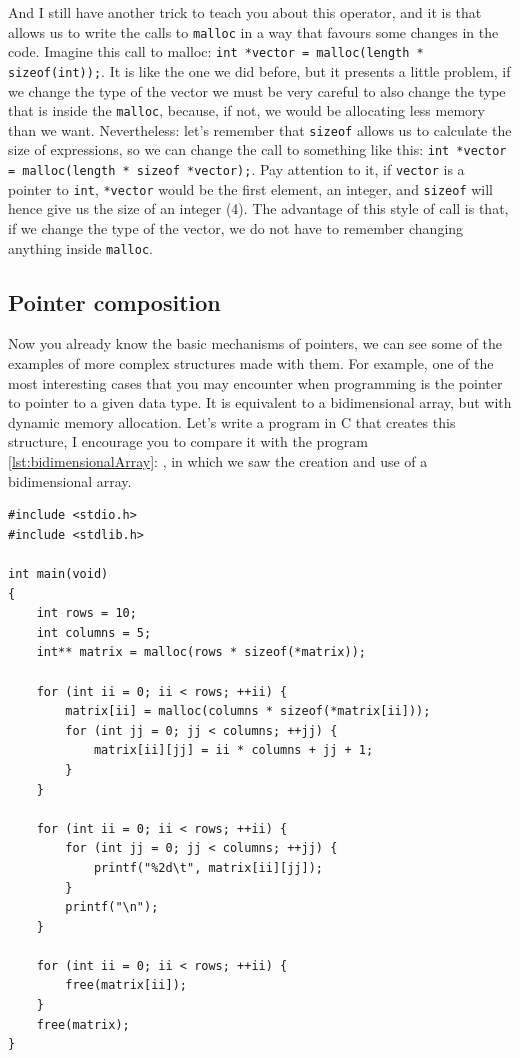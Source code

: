 \documentclass[a4paper]{article}
\begin{document}
And I still have another trick to teach you about this operator, and it is
that allows us to write the calls to \texttt{malloc} in a way that favours some
changes in the code. Imagine this call to malloc:
\lstinline[style=C]{int *vector = malloc(length * sizeof(int));}.
It is like the one we did before, but it presents a little problem, if we change
the type of the vector we must be very careful to also change the type that
is inside the \texttt{malloc}, because, if not, we would be allocating less
memory than we want. Nevertheless: let's remember that \verb!sizeof! allows us
to calculate the size of expressions, so we can change the call to something
like this: \lstinline[style=C]{int *vector = malloc(length * sizeof *vector);}.
Pay attention to it, if \verb!vector! is a pointer to \verb!int!, \verb!*vector!
would be the first element, an integer, and \verb!sizeof! will hence give us
the size of an integer (4). The advantage of this style of call is that, if we
change the type of the vector, we do not have to remember changing anything
inside \verb!malloc!.

\subsection{Pointer composition}
Now you already know the basic mechanisms of pointers, we can see some of the
examples of more complex structures made with them. For example, one of the most
interesting cases that you may encounter when programming is the pointer to
pointer to a given data type. It is equivalent to a bidimensional array, but
with dynamic memory allocation. Let's write a program in C that creates this
structure, I encourage you to compare it with the program
\ref{lst:bidimensionalArray}: , in which we
saw the creation and use of a bidimensional array.

\noindent
\begin{minipage}[H]{\linewidth}
\mbox{}
\begin{lstlisting}[style=C,
caption={Reserva, uso y liberación de un vector de vectores},
label={lst:bidimensionalVector}]
#include <stdio.h>
#include <stdlib.h>

int main(void)
{
    int rows = 10;
    int columns = 5;
    int** matrix = malloc(rows * sizeof(*matrix));

    for (int ii = 0; ii < rows; ++ii) {
        matrix[ii] = malloc(columns * sizeof(*matrix[ii]));
        for (int jj = 0; jj < columns; ++jj) {
            matrix[ii][jj] = ii * columns + jj + 1;
        }
    }

    for (int ii = 0; ii < rows; ++ii) {
        for (int jj = 0; jj < columns; ++jj) {
            printf("%2d\t", matrix[ii][jj]);
        }
        printf("\n");
    }

    for (int ii = 0; ii < rows; ++ii) {
        free(matrix[ii]);
    }
    free(matrix);
}
\end{lstlisting}
\end{minipage}
\end{document}
